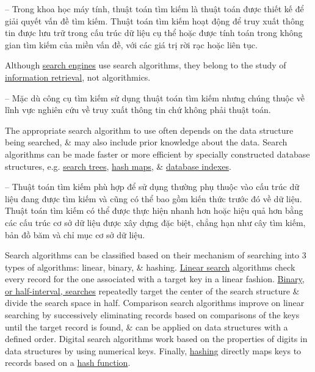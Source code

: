\documentclass[oneside]{book}
\begin{document}
-- Trong khoa học máy tính, thuật toán tìm kiếm là thuật toán được thiết kế để giải quyết vấn đề tìm kiếm. Thuật toán tìm kiếm hoạt động để truy xuất thông tin được lưu trữ trong cấu trúc dữ liệu cụ thể hoặc được tính toán trong không gian tìm kiếm của miền vấn đề, với các giá trị rời rạc hoặc liên tục.

Although \href{https://en.wikipedia.org/wiki/Search_engine_(computing)}{search engines} use search algorithms, they belong to the study of \href{https://en.wikipedia.org/wiki/Information_retrieval}{information retrieval}, not algorithmics.

-- Mặc dù công cụ tìm kiếm sử dụng thuật toán tìm kiếm nhưng chúng thuộc về lĩnh vực nghiên cứu về truy xuất thông tin chứ không phải thuật toán.

The appropriate search algorithm to use often depends on the data structure being searched, \& may also include prior knowledge about the data. Search algorithms can be made faster or more efficient by specially constructed database structures, e.g. \href{https://en.wikipedia.org/wiki/Search_tree}{search trees}, \href{https://en.wikipedia.org/wiki/Hash_map}{hash maps}, \& \href{https://en.wikipedia.org/wiki/Database_index}{database indexes}.

-- Thuật toán tìm kiếm phù hợp để sử dụng thường phụ thuộc vào cấu trúc dữ liệu đang được tìm kiếm và cũng có thể bao gồm kiến thức trước đó về dữ liệu. Thuật toán tìm kiếm có thể được thực hiện nhanh hơn hoặc hiệu quả hơn bằng các cấu trúc cơ sở dữ liệu được xây dựng đặc biệt, chẳng hạn như cây tìm kiếm, bản đồ băm và chỉ mục cơ sở dữ liệu.

Search algorithms can be classified based on their mechanism of searching into 3 types of algorithms: linear, binary, \& hashing. \href{https://en.wikipedia.org/wiki/Linear_search}{Linear search} algorithms check every record for the one associated with a target key in a linear fashion. \href{https://en.wikipedia.org/wiki/Binary_search_algorithm}{Binary, or half-interval, searches} repeatedly target the center of the search structure \& divide the search space in half. Comparison search algorithms improve on linear searching by successively eliminating records based on comparisons of the keys until the target record is found, \& can be applied on data structures with a defined order. Digital search algorithms work based on the properties of digits in data structures by using numerical keys. Finally, \href{https://en.wikipedia.org/wiki/Hash_table}{hashing} directly maps keys to records based on a \href{https://en.wikipedia.org/wiki/Hash_function}{hash function}.
\end{document}
